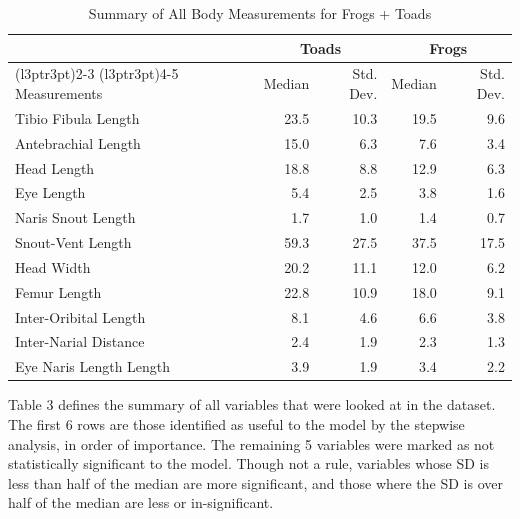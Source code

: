 \documentclass[
]{article}
\begin{document}
\begin{longtable}[t]{lrrrr}
\caption{\label{tab:unnamed-chunk-6}Summary of All Body Measurements for 
                                     Frogs + Toads}\\
\toprule
\multicolumn{1}{c}{ } & \multicolumn{2}{c}{Toads} & \multicolumn{2}{c}{Frogs} \\
\cmidrule(l{3pt}r{3pt}){2-3} \cmidrule(l{3pt}r{3pt}){4-5}
Measurements & Median & Std. Dev. & Median & Std. Dev.\\
\midrule
Tibio Fibula Length & 23.5 & 10.3 & 19.5 & 9.6\\
Antebrachial Length & 15.0 & 6.3 & 7.6 & 3.4\\
Head Length & 18.8 & 8.8 & 12.9 & 6.3\\
Eye Length & 5.4 & 2.5 & 3.8 & 1.6\\
Naris Snout Length & 1.7 & 1.0 & 1.4 & 0.7\\
\addlinespace
Snout-Vent Length & 59.3 & 27.5 & 37.5 & 17.5\\
Head Width & 20.2 & 11.1 & 12.0 & 6.2\\
Femur Length & 22.8 & 10.9 & 18.0 & 9.1\\
Inter-Oribital Length & 8.1 & 4.6 & 6.6 & 3.8\\
Inter-Narial Distance & 2.4 & 1.9 & 2.3 & 1.3\\
\addlinespace
Eye Naris Length Length & 3.9 & 1.9 & 3.4 & 2.2\\
\bottomrule
\end{longtable}

Table 3 defines the summary of all variables that were looked at in the
dataset. The first 6 rows are those identified as useful to the model by
the stepwise analysis, in order of importance. The remaining 5 variables
were marked as not statistically significant to the model. Though not a
rule, variables whose SD is less than half of the median are more
significant, and those where the SD is over half of the median are less
or in-significant.
\end{document}
